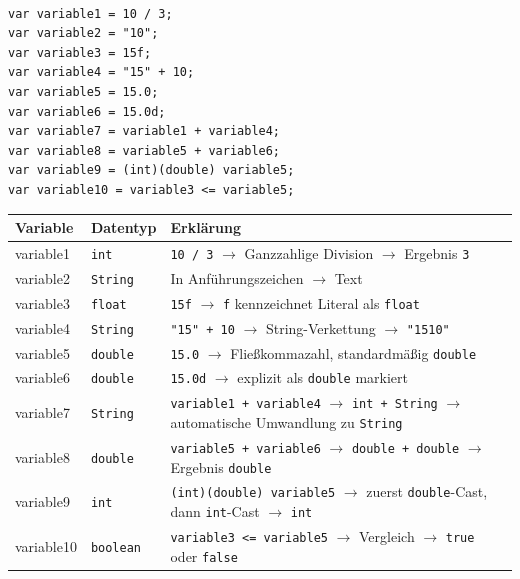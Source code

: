 \documentclass[12pt]{scrartcl}
\begin{document}
\begin{enumerate}
    \
    \begin{flushleft}
       \begin{lstlisting}[style=javaStyle, caption={Code-Ausschnitt zur Bestimmung der Datentypen}, xleftmargin=0pt, framexleftmargin=0pt]
var variable1 = 10 / 3;
var variable2 = "10";
var variable3 = 15f;
var variable4 = "15" + 10;
var variable5 = 15.0;
var variable6 = 15.0d;
var variable7 = variable1 + variable4;
var variable8 = variable5 + variable6;
var variable9 = (int)(double) variable5;
var variable10 = variable3 <= variable5;
        \end{lstlisting}
        \end{flushleft}        
        \begin{table}[H]
        \centering
        \begin{tabular}{@{}l|l|p{8cm}@{}}
        \toprule
            \textbf{Variable} & \textbf{Datentyp} & \textbf{Erklärung} \\ \midrule
            variable1 & \texttt{int} & \texttt{10 / 3} $\rightarrow$ Ganzzahlige Division $\rightarrow$ Ergebnis \texttt{3} \\
            variable2 & \texttt{String} & In Anführungszeichen $\rightarrow$ Text \\
            variable3 & \texttt{float} & \texttt{15f} $\rightarrow$ \texttt{f} kennzeichnet Literal als \texttt{float} \\
            variable4 & \texttt{String} & \texttt{"15" + 10} $\rightarrow$ String-Verkettung $\rightarrow$ \texttt{"1510"} \\
            variable5 & \texttt{double} & \texttt{15.0} $\rightarrow$ Fließkommazahl, standardmäßig \texttt{double} \\
            variable6 & \texttt{double} & \texttt{15.0d} $\rightarrow$ explizit als \texttt{double} markiert \\
            variable7 & \texttt{String} & \texttt{variable1 + variable4} $\rightarrow$ \texttt{int + String} $\rightarrow$ automatische Umwandlung zu \texttt{String} \\
            variable8 & \texttt{double} & \texttt{variable5 + variable6} $\rightarrow$ \texttt{double + double} $\rightarrow$ Ergebnis \texttt{double} \\
            variable9 & \texttt{int} & \texttt{(int)(double) variable5} $\rightarrow$ zuerst \texttt{double}-Cast, dann \texttt{int}-Cast $\rightarrow$ \texttt{int} \\
            variable10 & \texttt{boolean} & \texttt{variable3 <= variable5} $\rightarrow$ Vergleich $\rightarrow$ \texttt{true} oder \texttt{false} \\ \bottomrule
        \end{tabular}
        \end{table}
    

\end{enumerate}
\end{document}
